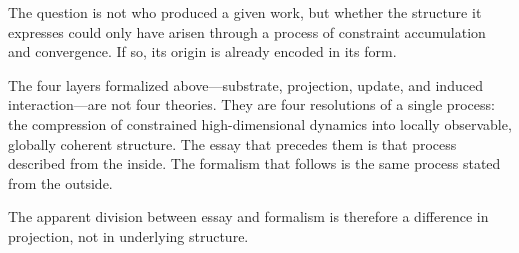 \documentclass[11pt]{article}
\theoremstyle{plain}
\theoremstyle{definition}
\theoremstyle{remark}
\begin{document}
The question is not who produced a given work, but whether the structure
it expresses could only have arisen through a process of constraint
accumulation and convergence. If so, its origin is already encoded in
its form.

The four layers formalized above---substrate, projection, update, and
induced interaction---are not four theories. They are four resolutions
of a single process: the compression of constrained high-dimensional
dynamics into locally observable, globally coherent structure. The essay
that precedes them is that process described from the inside. The
formalism that follows is the same process stated from the outside.

The apparent division between essay and formalism is therefore a difference
in projection, not in underlying structure.
\end{document}
